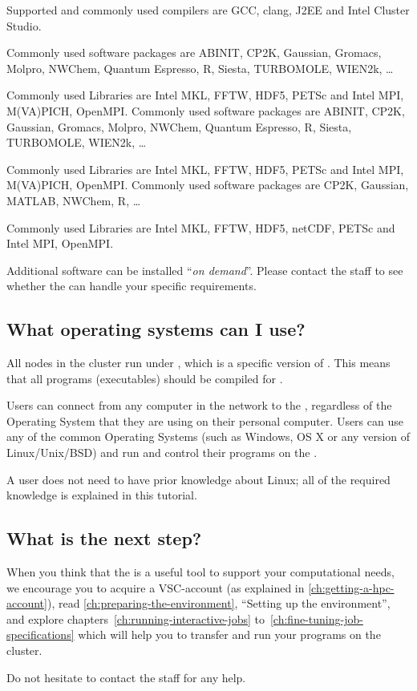 Supported and commonly used compilers are GCC, clang, J2EE and Intel Cluster
Studio.


\ifantwerpen
Commonly used software packages are ABINIT, CP2K, Gaussian, Gromacs, Molpro,
NWChem, Quantum Espresso, R, Siesta, TURBOMOLE, WIEN2k, \ldots

Commonly used Libraries are Intel MKL, FFTW, HDF5, PETSc and Intel MPI,
M(VA)PICH, OpenMPI.
\fi
\ifleuven
Commonly used software packages are ABINIT, CP2K, Gaussian, Gromacs, Molpro,
NWChem, Quantum Espresso, R, Siesta, TURBOMOLE, WIEN2k, \ldots

Commonly used Libraries are Intel MKL, FFTW, HDF5, PETSc and Intel MPI,
M(VA)PICH, OpenMPI.
\fi
\ifbrussel
Commonly used software packages are CP2K, Gaussian, MATLAB, NWChem, R, \ldots

Commonly used Libraries are Intel MKL, FFTW, HDF5, netCDF, PETSc and Intel MPI,
OpenMPI.
\fi

Additional software can be installed ``\emph{on demand}''. Please contact the
\hpc staff to see whether the \hpc can handle your specific requirements.

\subsection{What operating systems can I use?}
\label{sec:what-operating-systems-can-i-use}

All nodes in the \hpc cluster run under \operatingsystem, which is a specific
version of \operatingsystembase. This means that all programs (executables)
should be compiled for \operatingsystem.

Users can connect from any computer in the \university network to the
\hpc, regardless of the Operating System that they are using on their personal
computer.
Users can use any of the common Operating Systems (such as Windows, OS X or
any version of Linux/Unix/BSD) and run and control their programs on the \hpc.

A user does not need to have prior knowledge about Linux; all of the required
knowledge is explained in this tutorial.

\subsection{What is the next step?}
\label{sec:what-is-the-next-step}

When you think that the \hpc is a useful tool to support your computational
needs, we encourage you to acquire a VSC-account (as explained in
\autoref{ch:getting-a-hpc-account}), read
\autoref{ch:preparing-the-environment}, ``Setting up the environment'', and
explore chapters~\ref{ch:running-interactive-jobs}
to~\ref{ch:fine-tuning-job-specifications} which will help you to transfer and
run your programs on the \hpc cluster.

Do not hesitate to contact the \hpc staff for any help.
